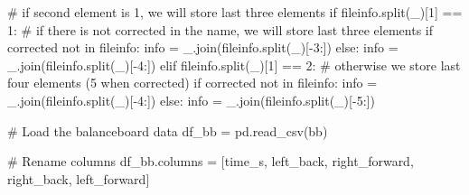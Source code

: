 \documentclass[
  letterpaper,
  DIV=11,
  numbers=noendperiod]{scrreprt}
\newenvironment{Shaded}{\begin{snugshade}}{\end{snugshade}}
\newcommand{\CommentTok}[1]{\textcolor[rgb]{0.37,0.37,0.37}{#1}}
\newcommand{\ControlFlowTok}[1]{\textcolor[rgb]{0.00,0.23,0.31}{#1}}
\newcommand{\DecValTok}[1]{\textcolor[rgb]{0.68,0.00,0.00}{#1}}
\newcommand{\KeywordTok}[1]{\textcolor[rgb]{0.00,0.23,0.31}{#1}}
\newcommand{\NormalTok}[1]{\textcolor[rgb]{0.00,0.23,0.31}{#1}}
\newcommand{\OperatorTok}[1]{\textcolor[rgb]{0.37,0.37,0.37}{#1}}
\newcommand{\StringTok}[1]{\textcolor[rgb]{0.13,0.47,0.30}{#1}}
\begin{document}
\begin{Shaded}
\begin{Highlighting}[]
    \CommentTok{\# if second element is 1, we will store last three elements}
    \ControlFlowTok{if}\NormalTok{ fileinfo.split(}\StringTok{\textquotesingle{}\_\textquotesingle{}}\NormalTok{)[}\DecValTok{1}\NormalTok{] }\OperatorTok{==} \StringTok{\textquotesingle{}1\textquotesingle{}}\NormalTok{:}
        \CommentTok{\# if there is not \textquotesingle{}corrected\textquotesingle{} in the name, we will store last three elements}
        \ControlFlowTok{if} \StringTok{\textquotesingle{}corrected\textquotesingle{}} \KeywordTok{not} \KeywordTok{in}\NormalTok{ fileinfo:}
\NormalTok{            info }\OperatorTok{=} \StringTok{\textquotesingle{}\_\textquotesingle{}}\NormalTok{.join(fileinfo.split(}\StringTok{\textquotesingle{}\_\textquotesingle{}}\NormalTok{)[}\OperatorTok{{-}}\DecValTok{3}\NormalTok{:])}
        \ControlFlowTok{else}\NormalTok{:}
\NormalTok{            info }\OperatorTok{=} \StringTok{\textquotesingle{}\_\textquotesingle{}}\NormalTok{.join(fileinfo.split(}\StringTok{\textquotesingle{}\_\textquotesingle{}}\NormalTok{)[}\OperatorTok{{-}}\DecValTok{4}\NormalTok{:])}
    \ControlFlowTok{elif}\NormalTok{ fileinfo.split(}\StringTok{\textquotesingle{}\_\textquotesingle{}}\NormalTok{)[}\DecValTok{1}\NormalTok{] }\OperatorTok{==} \StringTok{\textquotesingle{}2\textquotesingle{}}\NormalTok{:}
        \CommentTok{\# otherwise we store last four elements (5 when corrected)}
        \ControlFlowTok{if} \StringTok{\textquotesingle{}corrected\textquotesingle{}} \KeywordTok{not} \KeywordTok{in}\NormalTok{ fileinfo:}
\NormalTok{            info }\OperatorTok{=} \StringTok{\textquotesingle{}\_\textquotesingle{}}\NormalTok{.join(fileinfo.split(}\StringTok{\textquotesingle{}\_\textquotesingle{}}\NormalTok{)[}\OperatorTok{{-}}\DecValTok{4}\NormalTok{:])}
        \ControlFlowTok{else}\NormalTok{:}
\NormalTok{            info }\OperatorTok{=} \StringTok{\textquotesingle{}\_\textquotesingle{}}\NormalTok{.join(fileinfo.split(}\StringTok{\textquotesingle{}\_\textquotesingle{}}\NormalTok{)[}\OperatorTok{{-}}\DecValTok{5}\NormalTok{:])}

    \CommentTok{\# Load the balanceboard data}
\NormalTok{    df\_bb }\OperatorTok{=}\NormalTok{ pd.read\_csv(bb)}

    \CommentTok{\# Rename columns}
\NormalTok{    df\_bb.columns }\OperatorTok{=}\NormalTok{ [}\StringTok{\textquotesingle{}time\_s\textquotesingle{}}\NormalTok{, }\StringTok{\textquotesingle{}left\_back\textquotesingle{}}\NormalTok{, }\StringTok{\textquotesingle{}right\_forward\textquotesingle{}}\NormalTok{, }\StringTok{\textquotesingle{}right\_back\textquotesingle{}}\NormalTok{, }\StringTok{\textquotesingle{}left\_forward\textquotesingle{}}\NormalTok{]}


\end{Highlighting}
\end{Shaded}
\end{document}
